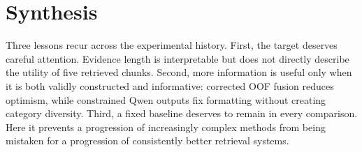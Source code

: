 \section{Synthesis}
Three lessons recur across the experimental history. First,
the target deserves careful attention. Evidence length is interpretable but
does not directly describe the utility of five retrieved chunks.
Second, more information is useful only when it is both validly
constructed and informative: corrected OOF fusion reduces
optimism, while constrained Qwen outputs fix formatting without
creating category diversity. Third, a fixed baseline deserves
to remain in every comparison. Here it prevents a progression
of increasingly complex methods from being mistaken for a
progression of consistently better retrieval systems.
